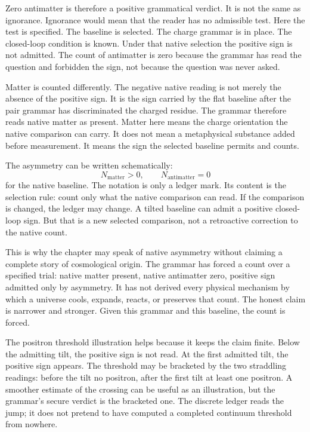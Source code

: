 Zero antimatter is therefore a positive grammatical verdict. It is not the
same as ignorance. Ignorance would mean that the reader has no admissible
test. Here the test is specified. The baseline is selected. The charge
grammar is in place. The closed-loop condition is known. Under that native
selection the positive sign is not admitted. The count of antimatter is zero
because the grammar has read the question and forbidden the sign, not because
the question was never asked.

Matter is counted differently. The negative native reading is not merely the
absence of the positive sign. It is the sign carried by the flat baseline
after the pair grammar has discriminated the charged residue. The grammar
therefore reads native matter as present. Matter here means the charge
orientation the native comparison can carry. It does not mean a metaphysical
substance added before measurement. It means the sign the selected baseline
permits and counts.

The asymmetry can be written schematically:
\[
  N_{\mathrm{matter}} > 0,
  \qquad
  N_{\mathrm{antimatter}} = 0
\]
for the native baseline. The notation is only a ledger mark. Its content is
the selection rule: count only what the native comparison can read. If the
comparison is changed, the ledger may change. A tilted baseline can admit a
positive closed-loop sign. But that is a new selected comparison, not a
retroactive correction to the native count.

This is why the chapter may speak of native asymmetry without claiming a
complete story of cosmological origin. The grammar has forced a count over a
specified trial: native matter present, native antimatter zero, positive sign
admitted only by asymmetry. It has not derived every physical mechanism by
which a universe cools, expands, reacts, or preserves that count. The honest
claim is narrower and stronger. Given this grammar and this baseline, the
count is forced.

The positron threshold illustration helps because it keeps the claim finite.
Below the admitting tilt, the positive sign is not read. At the first
admitted tilt, the positive sign appears. The threshold may be bracketed by
the two straddling readings: before the tilt no positron, after the first
tilt at least one positron. A smoother estimate of the crossing can be useful
as an illustration, but the grammar's secure verdict is the bracketed one.
The discrete ledger reads the jump; it does not pretend to have computed a
completed continuum threshold from nowhere.

